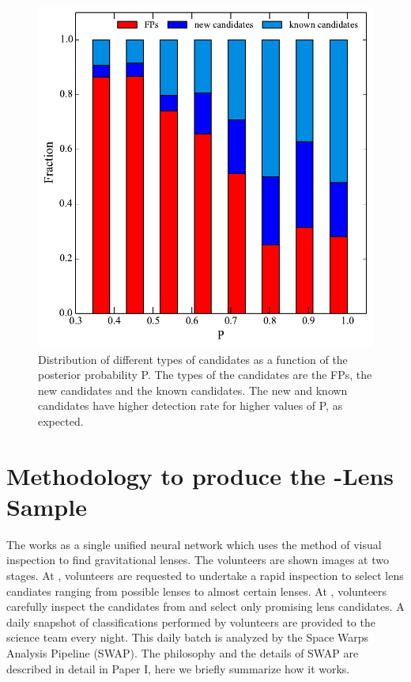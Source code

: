 \documentclass[useAMS,usenatbib,a4paper]{mn2e}
\begin{document}
\begin{figure}
\begin{center}
\includegraphics[scale=0.6]{sw-cfhtls-figs/cand_fp_P_frac.pdf}
\caption{ \label{fig:stackP}
Distribution of different types of candidates as a function of the posterior
probability P. The types of the candidates are the FPs, the new candidates and
the known candidates. The new and known candidates have higher detection rate
for higher values of P, as expected.}
\end{center}
\end{figure}


\section{Methodology to produce the \sw-\cfhtls Lens Sample}
\label{sec:swap}
The \sw works as a single unified neural network which uses the method of visual
inspection to find gravitational lenses. The volunteers are shown images at two
stages. At \StageOne, volunteers are requested to undertake a rapid inspection to
select lens candiates ranging from possible lenses to almost certain lenses. At
\StageTwo, volunteers carefully inspect the candidates from \StageOne and select only
promising lens candidates. A daily snapshot of classifications performed by
volunteers are provided to the science team every night. This daily batch is
analyzed by the Space Warps Analysis Pipeline (SWAP). The philosophy and the
details of SWAP are described in detail in Paper I, here we briefly summarize
how it works.
\end{document}
